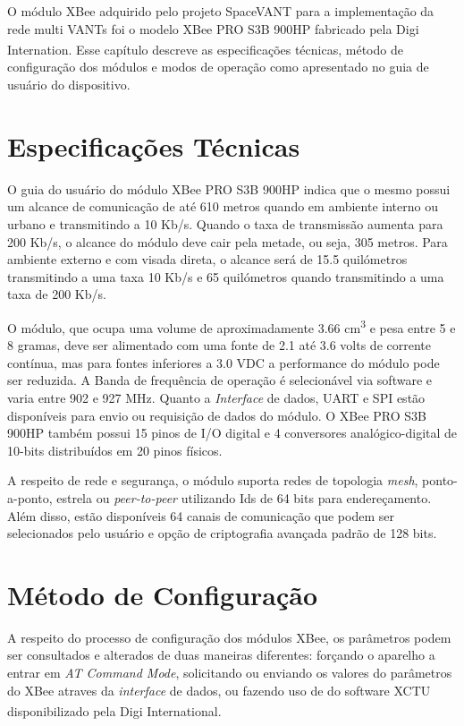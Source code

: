 \label{Cap:Xbee}

O módulo XBee adquirido pelo projeto SpaceVANT para a implementação da rede multi VANTs foi o modelo XBee PRO S3B 900HP fabricado pela Digi Internation\textsuperscript{\texttrademark}. Esse capítulo descreve as especificações técnicas, método de configuração dos módulos e modos de operação como apresentado no guia de usuário do dispositivo. \cite{xbeemanuals3}

\section{Especificações Técnicas}

O guia do usuário do módulo XBee PRO S3B 900HP indica que o mesmo possui um alcance de comunicação de até 610 metros quando em ambiente interno ou urbano e transmitindo a 10 Kb/s. Quando o taxa de transmissão aumenta para 200 Kb/s, o alcance do módulo deve cair pela metade, ou seja, 305 metros. Para ambiente externo e com visada direta, o alcance será de 15.5 quilómetros transmitindo a uma taxa 10 Kb/s e 65 quilómetros quando transmitindo a uma taxa de 200 Kb/s.

O módulo, que ocupa uma volume de aproximadamente 3.66 cm\textsuperscript{3} e pesa entre 5 e 8 gramas, deve ser alimentado com uma fonte de 2.1 até 3.6 volts de corrente contínua, mas para fontes inferiores a 3.0 VDC a performance do módulo pode ser reduzida. A Banda de frequência de operação é selecionável via software e varia entre 902 e 927 MHz. Quanto a \emph{Interface} de dados, UART e SPI estão disponíveis para envio ou requisição de dados do módulo. O XBee PRO S3B 900HP também possui 15 pinos de I/O digital e 4 conversores analógico-digital de 10-bits distribuídos em 20 pinos físicos.

A respeito de rede e segurança, o módulo suporta redes de topologia \emph{mesh}, ponto-a-ponto, estrela ou \emph{peer-to-peer} utilizando Ids de 64 bits para endereçamento. Além disso, estão disponíveis 64 canais de comunicação que podem ser selecionados pelo usuário e opção de criptografia avançada padrão de 128 bits.

\section{Método de Configuração}

A respeito do processo de configuração dos módulos XBee, os parâmetros podem ser consultados e alterados de duas maneiras diferentes: forçando o aparelho a entrar em \emph{AT Command Mode}, solicitando ou enviando os valores do parâmetros do XBee atraves da \emph{interface} de dados, ou fazendo uso de do software XCTU disponibilizado pela Digi International\textsuperscript{\texttrademark}. 

